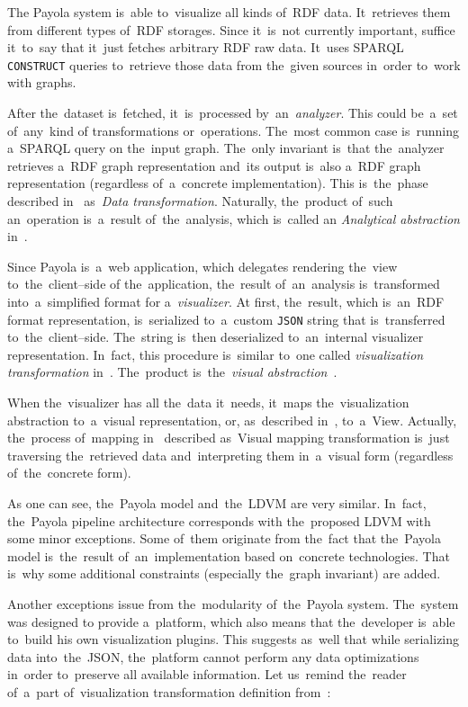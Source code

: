 The Payola system is~able to~visualize all kinds of~RDF data. It~retrieves them from different
types of~RDF storages. Since it~is~not currently important, suffice it~to~say that it~just fetches
arbitrary RDF raw data. It~uses SPARQL \texttt{CONSTRUCT} queries to~retrieve those data from
the~given sources in~order to~work with graphs.

After the~dataset is~fetched, it~is~processed by~an~\emph{analyzer}. This could be~a~set of~any~kind
of transformations or~operations. The~most common case is~running a~SPARQL query
on the~input graph. The~only invariant is~that the~analyzer retrieves a~RDF graph
representation and~its output is~also a~RDF graph representation (regardless of~a~concrete
implementation). This is~the~phase described in~\cite{ldvm} as~\emph{Data transformation}.
Naturally, the~product of~such an~operation is~a~result of~the~analysis, which is~called an
\emph{Analytical abstraction} in~\cite{ldvm}.

\begin{sloppypar}
Since Payola is~a~web application, which delegates rendering the~view to~the~client--side
of the~application, the~result of~an~analysis is~transformed into~a~simplified format for a~\emph{visualizer}.
At first, the~result, which is~an~RDF format representation, is~serialized to~a~custom \texttt{JSON} string
that is~transferred to~the~client--side. The~string is~then deserialized to~an~internal visualizer
representation. In~fact, this procedure is~similar to~one called \emph{visualization transformation}
in~\cite{ldvm}. The~product is~the~\emph{visual abstraction}~\cite{ldvm}.
\end{sloppypar}

When the~visualizer has all the~data it~needs, it~maps the~visualization abstraction to~a~visual
representation, or, as~described in~\cite{ldvm}, to~a~View. Actually, the~process of~mapping in~\cite{ldvm}
described as~Visual mapping transformation is~just traversing the~retrieved data and~interpreting
them in~a~visual form (regardless of~the~concrete form).

As one can see, the~Payola model and~the~LDVM are very similar. In~fact, the~Payola pipeline
architecture corresponds with the~proposed LDVM with some minor exceptions. Some of~them
originate from the~fact that the~Payola model is~the~result of~an~implementation
based on~concrete technologies. That is~why some additional constraints (especially
the~graph invariant) are added.

Another exceptions issue from the~modularity of~the~Payola system. The~system was designed
to provide a~platform, which also means that the~developer is~able to~build his own visualization 
plugins. This suggests as~well that while serializing data into~the~JSON, the~platform cannot perform
any data optimizations in~order to~preserve all available information. Let us~remind the~reader of~a~part of~visualization transformation definition from~\cite{ldvm}:

